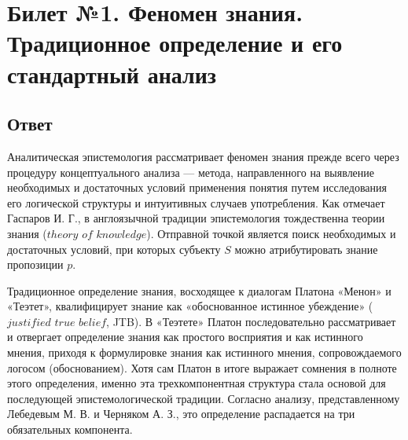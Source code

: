 \documentclass[a4paper,12pt]{article}
\begin{document}
\tableofcontents

\newpage
\section{Билет №1. Феномен знания. Традиционное определение и его стандартный анализ}

\subsection{Ответ}

Аналитическая эпистемология рассматривает феномен знания прежде всего через процедуру концептуального анализа — метода, направленного на выявление необходимых и достаточных условий применения понятия путем исследования его логической структуры и интуитивных случаев употребления. Как отмечает Гаспаров И. Г., в англоязычной традиции эпистемология тождественна теории знания ($theory$ $of$ $knowledge$). Отправной точкой является поиск необходимых и достаточных условий, при которых субъекту $S$ можно атрибутировать знание пропозиции $p$.

Традиционное определение знания, восходящее к диалогам Платона «Менон» и «Теэтет», квалифицирует знание как «обоснованное истинное убеждение» ($justified$ $true$ $belief$, JTB). В «Теэтете» Платон последовательно рассматривает и отвергает определение знания как простого восприятия и как истинного мнения, приходя к формулировке знания как истинного мнения, сопровождаемого логосом (обоснованием). Хотя сам Платон в итоге выражает сомнения в полноте этого определения, именно эта трехкомпонентная структура стала основой для последующей эпистемологической традиции. Согласно анализу, представленному Лебедевым М. В. и Черняком А. З., это определение распадается на три обязательных компонента.
\end{document}
